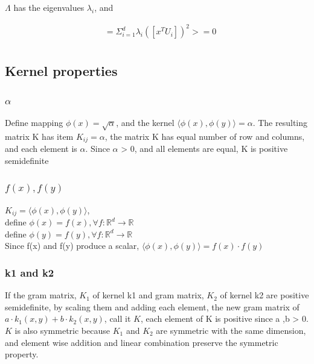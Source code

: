 \documentclass[letterpaper, 12]{article}
\begin{document}
$\Lambda$ has the eigenvalues $\lambda_{i}$, and 

\begin{equation*}
\begin{split}
&= \Sigma_{i =1}^{d} \lambda_{i} ([x^T U_{i}])^2 >= 0\\
\end{split}
\end{equation*}


\subsection{Kernel properties}
\subsubsection{$\alpha$}
Define mapping $\phi (x) = \sqrt{\alpha}$, and the kernel $\langle \phi(x), \phi(y) \rangle = \alpha$.
The resulting matrix K has item $K_{ij} = \alpha $, the matrix K has equal number of row and columns, and each element is $\alpha$. Since $\alpha$ > 0, and all elements are equal, K is positive semidefinite
 
\subsubsection{$f(x), f(y)$}
$K_{ij} = \langle \phi (x),  \phi (y) \rangle$, \\
define $\phi(x) = f(x), \forall f: \mathbb{R}^{d} \rightarrow \mathbb{R}$\\
define $\phi(y) = f(y), \forall f: \mathbb{R}^{d} \rightarrow \mathbb{R}$\\
Since f(x) and f(y) produce a scalar,  $\langle \phi (x),  \phi (y) \rangle = f(x) \cdot f(y)$

\subsubsection{k1 and k2}
If the gram matrix, $K_{1}$ of kernel k1 and gram matrix, $K_{2}$ of kernel k2 are positive semidefinite, by scaling them and adding each element, the new gram matrix of $a \cdot k_{1}(x, y) + b \cdot k_{2}(x, y)$, call it $K$, each element of K is positive since a ,b > 0.\\
$K$ is also symmetric because $K_{1}$ and $K_{2}$ are symmetric with the same dimension, and element wise addition and linear combination preserve the symmetric property.\\
\end{document}
